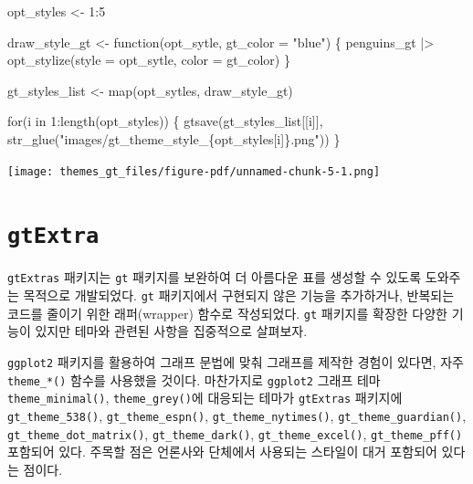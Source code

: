 \documentclass[
  letterpaper,
]{book}
\newenvironment{Shaded}{\begin{snugshade}}{\end{snugshade}}
\newcommand{\AttributeTok}[1]{\textcolor[rgb]{0.40,0.45,0.13}{#1}}
\newcommand{\ControlFlowTok}[1]{\textcolor[rgb]{0.00,0.23,0.31}{#1}}
\newcommand{\DecValTok}[1]{\textcolor[rgb]{0.68,0.00,0.00}{#1}}
\newcommand{\FunctionTok}[1]{\textcolor[rgb]{0.28,0.35,0.67}{#1}}
\newcommand{\NormalTok}[1]{\textcolor[rgb]{0.00,0.23,0.31}{#1}}
\newcommand{\OtherTok}[1]{\textcolor[rgb]{0.00,0.23,0.31}{#1}}
\newcommand{\SpecialCharTok}[1]{\textcolor[rgb]{0.37,0.37,0.37}{#1}}
\newcommand{\StringTok}[1]{\textcolor[rgb]{0.13,0.47,0.30}{#1}}
\begin{document}
\begin{Shaded}
\begin{Highlighting}[]
\NormalTok{opt\_styles }\OtherTok{\textless{}{-}} \DecValTok{1}\SpecialCharTok{:}\DecValTok{5}

\NormalTok{draw\_style\_gt }\OtherTok{\textless{}{-}} \ControlFlowTok{function}\NormalTok{(opt\_sytle, }\AttributeTok{gt\_color =} \StringTok{"blue"}\NormalTok{) \{}
\NormalTok{  penguins\_gt }\SpecialCharTok{|\textgreater{}} 
    \FunctionTok{opt\_stylize}\NormalTok{(}\AttributeTok{style =}\NormalTok{ opt\_sytle, }\AttributeTok{color =}\NormalTok{ gt\_color)}
\NormalTok{\}                }

\NormalTok{gt\_styles\_list }\OtherTok{\textless{}{-}} \FunctionTok{map}\NormalTok{(opt\_sytles, draw\_style\_gt)}


\ControlFlowTok{for}\NormalTok{(i }\ControlFlowTok{in} \DecValTok{1}\SpecialCharTok{:}\FunctionTok{length}\NormalTok{(opt\_styles)) \{}
  \FunctionTok{gtsave}\NormalTok{(gt\_styles\_list[[i]], }\FunctionTok{str\_glue}\NormalTok{(}\StringTok{"images/gt\_theme\_style\_\{opt\_styles[i]\}.png"}\NormalTok{))}
\NormalTok{\}}
\end{Highlighting}
\end{Shaded}

\texttt{[image: themes\_gt\_files/figure-pdf/unnamed-chunk-5-1.png]}

\hypertarget{gtextra}{%
\section{\texorpdfstring{\texttt{gtExtra}}{gtExtra}}\label{gtextra}}

\texttt{gtExtras} 패키지는 \texttt{gt} 패키지를 보완하여 더 아름다운
표를 생성할 수 있도록 도와주는 목적으로 개발되었다. \texttt{gt}
패키지에서 구현되지 않은 기능을 추가하거나, 반복되는 코드를 줄이기 위한
래퍼(wrapper) 함수로 작성되었다. \texttt{gt} 패키지를 확장한 다양한
기능이 있지만 테마와 관련된 사항을 집중적으로 살펴보자.

\texttt{ggplot2} 패키지를 활용하여 그래프 문법에 맞춰 그래프를 제작한
경험이 있다면, 자주 \texttt{theme\_*()} 함수를 사용했을 것이다.
마찬가지로 \texttt{ggplot2} 그래프 테마 \texttt{theme\_minimal()},
\texttt{theme\_grey()}에 대응되는 테마가 \texttt{gtExtras} 패키지에
\texttt{gt\_theme\_538()}, \texttt{gt\_theme\_espn()},
\texttt{gt\_theme\_nytimes()}, \texttt{gt\_theme\_guardian()},
\texttt{gt\_theme\_dot\_matrix()}, \texttt{gt\_theme\_dark()},
\texttt{gt\_theme\_excel()}, \texttt{gt\_theme\_pff()} 포함되어 있다.
주목할 점은 언론사와 단체에서 사용되는 스타일이 대거 포함되어 있다는
점이다.
\end{document}

